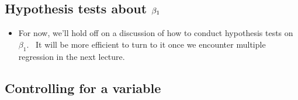 \documentclass[11pt]{article}
\begin{document}
\subsection{Hypothesis tests about $\protect\beta _{1}$}

\begin{itemize}
\item For now, we'll hold off on a discussion of how to conduct hypothesis
tests on $\beta _{1}.$ \ It will be more efficient to turn to it once we
encounter multiple regression in the next lecture. \ 
\end{itemize}

\subsection{Controlling for a variable}
\end{document}
